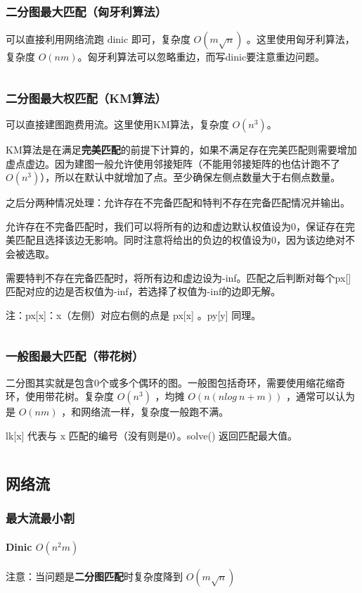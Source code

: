 \documentclass[a4paper,11pt]{article}
\begin{document}
\subsubsection{二分图最大匹配（匈牙利算法）}
可以直接利用网络流跑 dinic 即可，复杂度 \(O(m\sqrt{n})\) 。这里使用匈牙利算法，复杂度 \(O(nm)\)。匈牙利算法可以忽略重边，而写dinic要注意重边问题。
\inputminted[linenos]{c++}{graph/hungarian.cpp}
\subsubsection{二分图最大权匹配（KM算法）}
可以直接建图跑费用流。这里使用KM算法，复杂度 \(O(n^3)\)。

KM算法是在满足\textbf{完美匹配}的前提下计算的，如果不满足存在完美匹配则需要增加虚点虚边。因为建图一般允许使用邻接矩阵（不能用邻接矩阵的也估计跑不了 \(O(n^3)\)），所以在默认中就增加了点。至少确保左侧点数量大于右侧点数量。

之后分两种情况处理：允许存在不完备匹配和特判不存在完备匹配情况并输出。

允许存在不完备匹配时，我们可以将所有的边和虚边默认权值设为0，保证存在完美匹配且选择该边无影响。同时注意将给出的负边的权值设为0，因为该边绝对不会被选取。

需要特判不存在完备匹配时，将所有边和虚边设为-inf。匹配之后判断对每个px[]匹配对应的边是否权值为-inf，若选择了权值为-inf的边即无解。

注：px[x]：x（左侧）对应右侧的点是 px[x] 。py[y] 同理。

\inputminted[linenos]{c++}{graph/km.cpp}
\subsubsection{一般图最大匹配（带花树）}
二分图其实就是包含0个或多个偶环的图。一般图包括奇环，需要使用缩花缩奇环，使用带花树。复杂度 \(O(n^3)\) ，均摊 \(O(n(n log\ n+m))\) ，通常可以认为是 \(O(nm)\) ，和网络流一样，复杂度一般跑不满。

lk[x] 代表与 x 匹配的编号（没有则是0）。solve() 返回匹配最大值。
\inputminted[linenos]{c++}{graph/flowertree.cpp}

\subsection{网络流}
\subsubsection{最大流最小割}
\paragraph{Dinic \(O(n^2m)\)}
注意：当问题是\textbf{二分图匹配}时复杂度降到 \(O(m\sqrt{n})\)
\inputminted[linenos]{c++}{graph/dinic.cpp}
\end{document}
